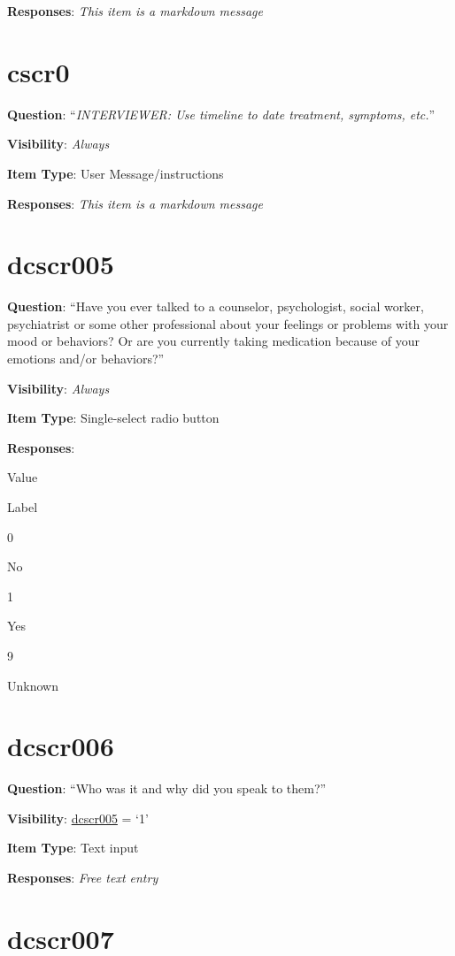 \documentclass[]{book}
\begin{document}
\textbf{Responses}: \emph{This item is a markdown message}

\hypertarget{cscr0}{%
\section{cscr0}\label{cscr0}}

\textbf{Question}: ``\emph{INTERVIEWER: Use timeline to date treatment, symptoms, etc.}''

\textbf{Visibility}: \emph{Always}

\textbf{Item Type}: User Message/instructions

\textbf{Responses}: \emph{This item is a markdown message}

\hypertarget{dcscr005}{%
\section{dcscr005}\label{dcscr005}}

\textbf{Question}: ``Have you ever talked to a counselor, psychologist, social worker, psychiatrist or some other professional about your feelings or problems with your mood or behaviors? Or are you currently taking medication because of your emotions and/or behaviors?''

\textbf{Visibility}: \emph{Always}

\textbf{Item Type}: Single-select radio button

\textbf{Responses}:

Value

Label

0

No

1

Yes

9

Unknown

\hypertarget{dcscr006}{%
\section{dcscr006}\label{dcscr006}}

\textbf{Question}: ``Who was it and why did you speak to them?''

\textbf{Visibility}: \protect\hyperlink{dcscr005}{dcscr005} = `1'

\textbf{Item Type}: Text input

\textbf{Responses}: \emph{Free text entry}

\hypertarget{dcscr007}{%
\section{dcscr007}\label{dcscr007}}
\end{document}
